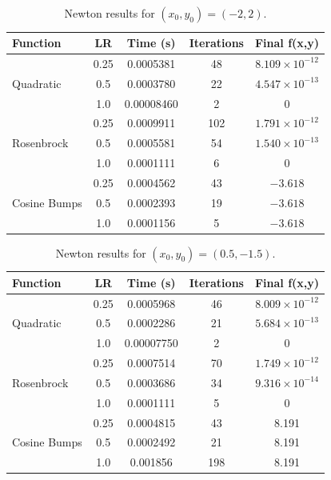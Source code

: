 \documentclass[conference]{IEEEtran}
\begin{document}
\begin{table}[H]
    \centering
    \caption{Newton results for $(x_0,y_0) = (-2,2)$.}
    \label{tab:newton_neg2_2}
    \begin{tabular}{lcccc}
        \hline
        \textbf{Function} & \textbf{LR} & \textbf{Time (s)} &
        \textbf{Iterations} & \textbf{Final f(x,y)} \\
        \hline

        \multirow{3}{*}{Quadratic}
        & 0.25 & 0.0005381 & 48 & $8.109\times10^{-12}$ \\
        & 0.5  & 0.0003780 & 22 & $4.547\times10^{-13}$ \\
        & 1.0  & 0.00008460 & 2 & 0 \\
        \hline

        \multirow{3}{*}{Rosenbrock}
        & 0.25 & 0.0009911 & 102 & $1.791\times10^{-12}$ \\
        & 0.5  & 0.0005581 & 54 & $1.540\times10^{-13}$ \\
        & 1.0  & 0.0001111 & 6 & 0 \\
        \hline

        \multirow{3}{*}{Cosine Bumps}
        & 0.25 & 0.0004562 & 43 & $-3.618$ \\
        & 0.5  & 0.0002393 & 19 & $-3.618$ \\
        & 1.0  & 0.0001156 & 5 & $-3.618$ \\
        \hline

    \end{tabular}
\end{table}

\begin{table}[H]
    \centering
    \caption{Newton results for $(x_0,y_0) = (0.5,-1.5)$.}
    \label{tab:newton_05_neg15}
    \begin{tabular}{lcccc}
        \hline
        \textbf{Function} & \textbf{LR} & \textbf{Time (s)} &
        \textbf{Iterations} & \textbf{Final f(x,y)} \\
        \hline

        \multirow{3}{*}{Quadratic}
        & 0.25 & 0.0005968 & 46 & $8.009\times10^{-12}$ \\
        & 0.5  & 0.0002286 & 21 & $5.684\times10^{-13}$ \\
        & 1.0  & 0.00007750 & 2 & 0 \\
        \hline

        \multirow{3}{*}{Rosenbrock}
        & 0.25 & 0.0007514 & 70 & $1.749\times10^{-12}$ \\
        & 0.5  & 0.0003686 & 34 & $9.316\times10^{-14}$ \\
        & 1.0  & 0.0001111 & 5 & 0 \\
        \hline

        \multirow{3}{*}{Cosine Bumps}
        & 0.25 & 0.0004815 & 43 & 8.191 \\
        & 0.5  & 0.0002492 & 21 & 8.191 \\
        & 1.0  & 0.001856 & 198 & 8.191 \\
        \hline

    \end{tabular}
\end{table}
\end{document}
